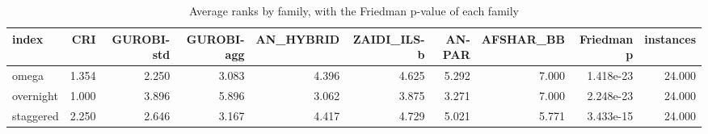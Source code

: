 \begin{table}[htbp]
\centering
\small
\caption{Average ranks by family, with the Friedman p-value of each family}
\label{tab:E10b_state_of_the_art_60s_b60_ranks_by_family}
\begin{tabular}{lrrrrrrrrr}
\toprule
index & CRI & GUROBI-std & GUROBI-agg & AN\_HYBRID & ZAIDI\_ILS-b & AN-PAR & AFSHAR\_BB & Friedman p & instances \\
\midrule
omega & 1.354 & 2.250 & 3.083 & 4.396 & 4.625 & 5.292 & 7.000 & 1.418e-23 & 24.000 \\
overnight & 1.000 & 3.896 & 5.896 & 3.062 & 3.875 & 3.271 & 7.000 & 2.248e-23 & 24.000 \\
staggered & 2.250 & 2.646 & 3.167 & 4.417 & 4.729 & 5.021 & 5.771 & 3.433e-15 & 24.000 \\
\bottomrule
\end{tabular}
\end{table}
